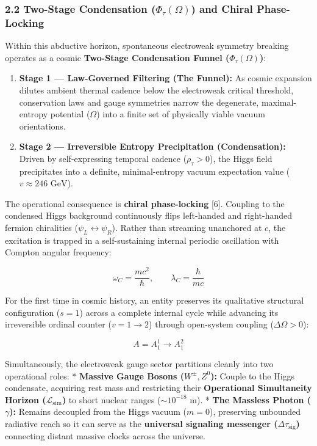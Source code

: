 \documentclass[
]{article}
\providecommand{\tightlist}{%
  \setlength{\itemsep}{0pt}\setlength{\parskip}{0pt}}
\begin{document}
\subsubsection{\texorpdfstring{2.2 Two-Stage Condensation
(\(\Phi_\tau(\Omega)\)) and Chiral
Phase-Locking}{2.2 Two-Stage Condensation (\textbackslash Phi\_\textbackslash tau(\textbackslash Omega)) and Chiral Phase-Locking}}\label{two-stage-condensation-phi_tauomega-and-chiral-phase-locking}

Within this abductive horizon, spontaneous electroweak symmetry breaking
operates as a cosmic \textbf{Two-Stage Condensation Funnel
(\(\Phi_\tau(\Omega)\))}:

\begin{enumerate}
\def\labelenumi{\arabic{enumi}.}
\tightlist
\item
  \textbf{Stage 1 --- Law-Governed Filtering (The Funnel):} As cosmic
  expansion dilutes ambient thermal cadence below the electroweak
  critical threshold, conservation laws and gauge symmetries narrow the
  degenerate, maximal-entropy potential (\(\Omega\)) into a finite set
  of physically viable vacuum orientations.
\item
  \textbf{Stage 2 --- Irreversible Entropy Precipitation
  (Condensation):} Driven by self-expressing temporal cadence
  (\(\rho_\tau > 0\)), the Higgs field precipitates into a definite,
  minimal-entropy vacuum expectation value
  (\(v \approx 246\text{ GeV}\)).
\end{enumerate}

The operational consequence is \textbf{chiral phase-locking} {[}6{]}.
Coupling to the condensed Higgs background continuously flips
left-handed and right-handed fermion chiralities
(\(\psi_L \leftrightarrow \psi_R\)). Rather than streaming unanchored at
\(c\), the excitation is trapped in a self-sustaining internal periodic
oscillation with Compton angular frequency:

\[\omega_C = \frac{mc^2}{\hbar}, \qquad \lambda_C = \frac{\hbar}{mc}\]

For the first time in cosmic history, an entity preserves its
qualitative structural configuration (\(s = 1\)) across a complete
internal cycle while advancing its irreversible ordinal counter
(\(v = 1 \to 2\)) through open-system coupling (\(\Delta\Omega > 0\)):

\[A = A_1^1 \longrightarrow A_1^2\]

Simultaneously, the electroweak gauge sector partitions cleanly into two
operational roles: * \textbf{Massive Gauge Bosons (\(W^\pm, Z^0\)):}
Couple to the Higgs condensate, acquiring rest mass and restricting
their \textbf{Operational Simultaneity Horizon
(\(\mathcal{L}_{\mathrm{sim}}\))} to short nuclear ranges
(\(\sim 10^{-18}\text{ m}\)). * \textbf{The Massless Photon
(\(\gamma\)):} Remains decoupled from the Higgs vacuum (\(m = 0\)),
preserving unbounded radiative reach so it can serve as the
\textbf{universal signaling messenger (\(\Delta\tau_{\mathrm{sig}}\))}
connecting distant massive clocks across the universe.
\end{document}

